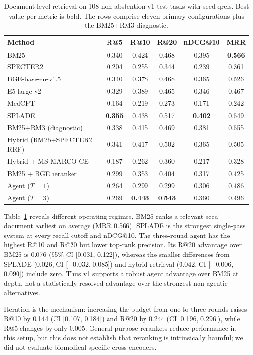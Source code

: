 \documentclass{article}
\begin{document}
\begin{table}[t]
\centering
\caption{Document-level retrieval on 108 non-abstention v1 test tasks with seed qrels. Best value per metric is bold. The rows comprise eleven primary configurations plus the BM25+RM3 diagnostic.}
\label{tab:main}
\small
\begin{tabular}{lccccc}
\toprule
\textbf{Method} & \textbf{R@5} & \textbf{R@10} & \textbf{R@20} & \textbf{nDCG@10} & \textbf{MRR} \\
\midrule
BM25 & 0.340 & 0.424 & 0.468 & 0.395 & \textbf{0.566} \\
SPECTER2 & 0.204 & 0.255 & 0.344 & 0.239 & 0.361 \\
BGE-base-en-v1.5 & 0.340 & 0.378 & 0.468 & 0.365 & 0.526 \\
E5-large-v2 & 0.329 & 0.389 & 0.465 & 0.346 & 0.467 \\
MedCPT & 0.164 & 0.219 & 0.273 & 0.171 & 0.242 \\
SPLADE & \textbf{0.355} & 0.438 & 0.517 & \textbf{0.402} & 0.549 \\
BM25+RM3 (diagnostic) & 0.338 & 0.415 & 0.469 & 0.381 & 0.555 \\
Hybrid (BM25+SPECTER2 RRF) & 0.341 & 0.417 & 0.502 & 0.365 & 0.505 \\
Hybrid + MS-MARCO CE & 0.187 & 0.262 & 0.360 & 0.217 & 0.328 \\
BM25 + BGE reranker & 0.299 & 0.353 & 0.404 & 0.317 & 0.425 \\
Agent ($T{=}1$) & 0.264 & 0.299 & 0.299 & 0.306 & 0.486 \\
Agent ($T{=}3$) & 0.269 & \textbf{0.443} & \textbf{0.543} & 0.360 & 0.496 \\
\bottomrule
\end{tabular}
\end{table}

Table~\ref{tab:main} reveals different operating regimes. BM25 ranks a relevant seed document earliest on average (MRR 0.566). SPLADE is the strongest single-pass system at every recall cutoff and nDCG@10. The three-round agent has the highest R@10 and R@20 but lower top-rank precision. Its R@20 advantage over BM25 is 0.076 (95\% CI [0.031, 0.122]), whereas the smaller differences from SPLADE (0.026, CI [$-$0.032, 0.085]) and hybrid retrieval (0.042, CI [$-$0.006, 0.090]) include zero. Thus v1 supports a robust agent advantage over BM25 at depth, not a statistically resolved advantage over the strongest non-agentic alternatives.

Iteration is the mechanism: increasing the budget from one to three rounds raises R@10 by 0.144 (CI [0.107, 0.184]) and R@20 by 0.244 (CI [0.196, 0.296]), while R@5 changes by only 0.005. General-purpose rerankers reduce performance in this setup, but this does not establish that reranking is intrinsically harmful; we did not evaluate biomedical-specific cross-encoders.
\end{document}
